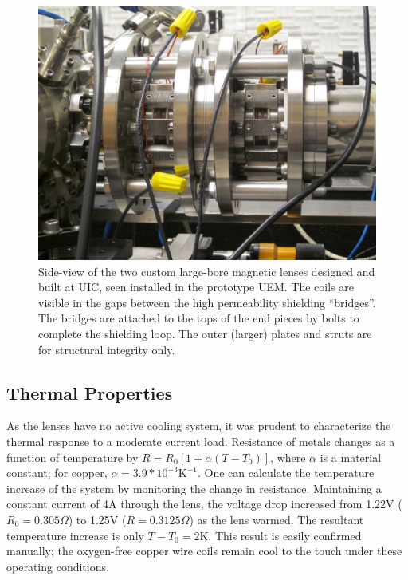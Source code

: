 \begin{figure}
  \centering
  \includegraphics{maglens.jpg}
  \caption[Side-view picture of the employed two custom large-bore magnetic lenses]{
    Side-view of the two custom large-bore magnetic lenses designed and built at UIC, seen installed in the prototype UEM.
    The coils are visible in the gaps between the high permeability shielding ``bridges''.
    The bridges are attached to the tops of the end pieces by bolts to complete the shielding loop.
    The outer (larger) plates and struts are for structural integrity only.
  }
  \label{fig:maglens-pic}
\end{figure}

\subsection{Thermal Properties} \label{sec:mag_lens_thermal}

As the lenses have no active cooling system, it was prudent to characterize the thermal response to a moderate current load.
Resistance of metals changes as a function of temperature by $ R = R_0 [ 1 + \alpha ( T - T_0 ) ] $, where $\alpha$ is a material constant; for copper, $\alpha = 3.9 * 10^{-3} \text{K}^{-1}$. 
One can calculate the temperature increase of the system by monitoring the change in resistance.
Maintaining a constant current of 4A through the lens, the voltage drop increased from 1.22V ($R_0 = 0.305\Omega$) to 1.25V ($R=0.3125\Omega$) as the lens warmed.
The resultant temperature increase is only $T - T_0 = 2\text{K}$.
This result is easily confirmed manually; the oxygen-free copper wire coils remain cool to the touch under these operating conditions.

